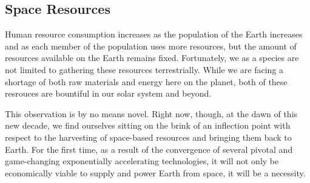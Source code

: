 \documentclass[letter,11pt]{article}
\begin{document}

\subsection{Space Resources}
\label{ps-space-resources}
Human resource consumption increases as the population of the Earth
increases and as each member of the population uses more resources,
but the amount of resources available on the Earth remains fixed.
Fortunately, we as a species are not limited to gathering these resources
terrestrially. While we are facing a shortage of both raw materials\cite{gordon}
and energy\cite{Seboldt2004} here on the planet, both of these resrouces are bountiful
in our solar system and beyond.

This observation is by no means novel. Right now, though, at the dawn
of this new decade, we find ourselves sitting on the brink of an inflection
point with respect to the harvesting of space-based resources and
bringing them back to Earth. For the first time, as a result of the
convergence of several pivotal and game-changing exponentially accelerating
technologies, it will not only be economically viable to supply and
power Earth from space, it will be a necessity.
\end{document}
